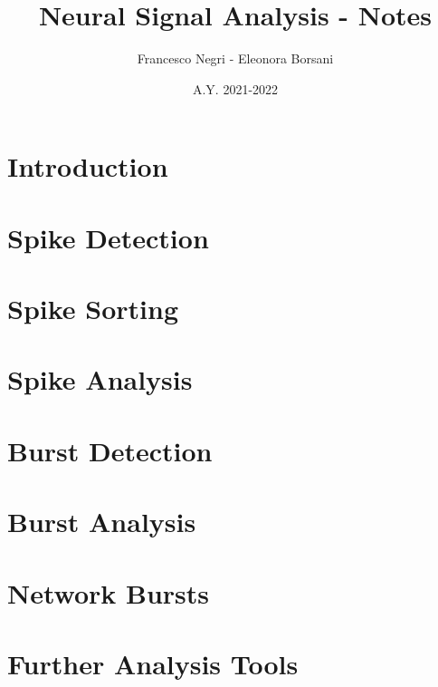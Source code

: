 \documentclass[12pt]{article}
\title{Neural Signal Analysis - Notes}
\author{Francesco Negri - Eleonora Borsani}
\date{A.Y. 2021-2022}
\begin{document}
\maketitle

\tableofcontents
\newpage

\section{Introduction}
\graphicspath{ {./images/1/} }

\newpage

\section{Spike Detection}
\graphicspath{ {./images/2/} }

\newpage

\section{Spike Sorting}
\graphicspath{ {./images/3/} }

\newpage

\section{Spike Analysis}
\graphicspath{ {./images/4/} }

\newpage

\section{Burst Detection}
\graphicspath{ {./images/5/} }

\newpage

\section{Burst Analysis}
\graphicspath{ {./images/6/} }

\newpage

\section{Network Bursts}
\graphicspath{ {./images/7/} }

\newpage

\section{Further Analysis Tools}
\graphicspath{ {./images/8/} }

\newpage
\end{document}
